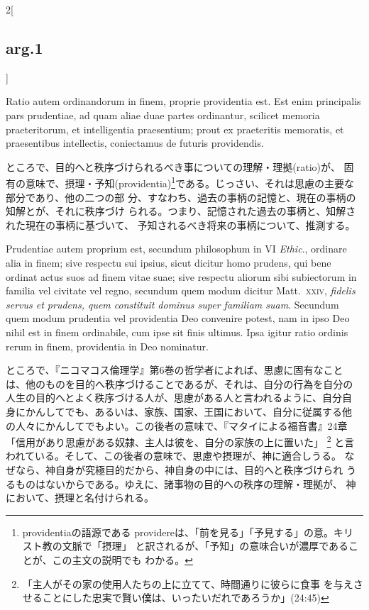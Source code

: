 \documentclass[paper=a4paper,fontsize=10pt,jafontsize=9pt,titlepage]{jlreq}
\begin{document}
\begin{paracol}{2}[\subsection{arg.1}]
\switchcolumn*

Ratio autem ordinandorum in finem, proprie
providentia est. Est enim principalis pars prudentiae, ad quam aliae
duae partes ordinantur, scilicet memoria praeteritorum, et intelligentia
praesentium; prout ex praeteritis memoratis, et praesentibus
intellectis, coniectamus de futuris providendis.

\switchcolumn

ところで、目的へと秩序づけられるべき事についての理解・理拠(ratio)が、
固有の意味で、摂理・予知(providentia)\footnote{providentiaの語源である
providereは、「前を見る」「予見する」の意。キリスト教の文脈で「摂理」
と訳されるが、「予知」の意味合いが濃厚であることが、この主文の説明でも
わかる。}である。じっさい、それは思慮の主要な部分であり、他の二つの部
分、すなわち、過去の事柄の記憶と、現在の事柄の知解とが、それに秩序づけ
られる。つまり、記憶された過去の事柄と、知解された現在の事柄に基づいて、
予知されるべき将来の事柄について、推測する。

\switchcolumn*

Prudentiae autem
proprium est, secundum philosophum in VI {\itshape Ethic}., ordinare alia in finem;
sive respectu sui ipsius, sicut dicitur homo prudens, qui bene ordinat
actus suos ad finem vitae suae; sive respectu aliorum sibi subiectorum
in familia vel civitate vel regno, secundum quem modum dicitur
Matt.~{\scshape xxiv}, {\itshape fidelis servus et prudens, quem constituit dominus super
familiam suam}. Secundum quem modum prudentia vel providentia Deo
convenire potest, nam in ipso Deo nihil est in finem ordinabile, cum
ipse sit finis ultimus. Ipsa igitur ratio ordinis rerum in finem,
 providentia in Deo nominatur.

\switchcolumn

ところで、『ニコマコス倫理学』第6巻の哲学者によれば、思慮に固有なこと
は、他のものを目的へ秩序づけることであるが、それは、自分の行為を自分の
人生の目的へとよく秩序づける人が、思慮がある人と言われるように、自分自
身にかんしてでも、あるいは、家族、国家、王国において、自分に従属する他
の人々にかんしてでもよい。この後者の意味で、『マタイによる福音書』24章
「信用があり思慮がある奴隷、主人は彼を、自分の家族の上に置いた」
\footnote{「主人がその家の使用人たちの上に立てて、時間通りに彼らに食事
を与えさせることにした忠実で賢い僕は、いったいだれであろうか」(24:45)}
と言われている。そして、この後者の意味で、思慮や摂理が、神に適合しうる。
なぜなら、神自身が究極目的だから、神自身の中には、目的へと秩序づけられ
うるものはないからである。ゆえに、諸事物の目的への秩序の理解・理拠が、
神において、摂理と名付けられる。


\end{paracol}
\end{document}
